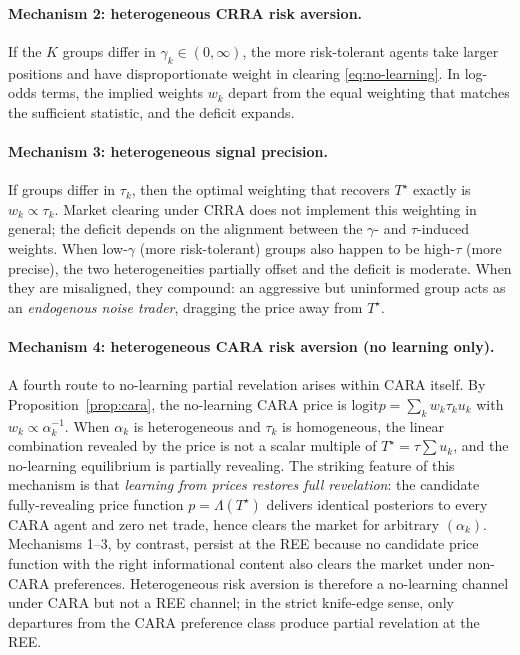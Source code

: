 \documentclass[12pt,letterpaper]{article}
\theoremstyle{definition}
\theoremstyle{remark}
\newcommand{\Lam}{\Lambda}            %
\newcommand{\logit}{\mathrm{logit}}
\newcommand{\Tstar}{T^{\!\star}}
\newcommand{\1}{\mathbf{1}}
\begin{document}
\paragraph{Mechanism 2: heterogeneous CRRA risk aversion.} If the $K$
groups differ in $\gamma_{k}\in(0,\infty)$, the more risk-tolerant agents
take larger positions and have disproportionate weight in clearing
\eqref{eq:no-learning}. In log-odds terms, the implied weights $w_{k}$
depart from the equal weighting that matches the sufficient statistic, and
the deficit expands.

\paragraph{Mechanism 3: heterogeneous signal precision.} If groups differ
in $\tau_{k}$, then the optimal weighting that recovers $\Tstar$ exactly is
$w_{k}\propto\tau_{k}$. Market clearing under CRRA does not implement this
weighting in general; the deficit depends on the alignment between the
$\gamma$- and $\tau$-induced weights. When low-$\gamma$ (more
risk-tolerant) groups also happen to be high-$\tau$ (more precise), the
two heterogeneities partially offset and the deficit is moderate. When
they are misaligned, they compound: an aggressive but uninformed group
acts as an \emph{endogenous noise trader}, dragging the price away from
$\Tstar$.

\paragraph{Mechanism 4: heterogeneous CARA risk aversion (no learning only).}
A fourth route to no-learning partial revelation arises within CARA itself.
By Proposition~\ref{prop:cara}, the no-learning CARA price is
$\logit p=\sum_{k}w_{k}\tau_{k}u_{k}$ with $w_{k}\propto\alpha_{k}^{-1}$.
When $\alpha_{k}$ is heterogeneous and $\tau_{k}$ is homogeneous, the
linear combination revealed by the price is not a scalar multiple of
$\Tstar=\tau\sum u_{k}$, and the no-learning equilibrium is partially
revealing. The striking feature of this mechanism is that
\emph{learning from prices restores full revelation}: the candidate
fully-revealing price function $p=\Lam(\Tstar)$ delivers identical
posteriors to every CARA agent and zero net trade, hence clears the market
for arbitrary $(\alpha_{k})$. Mechanisms 1--3, by contrast, persist at the
REE because no candidate price function with the right informational
content also clears the market under non-CARA preferences.
Heterogeneous risk aversion is therefore a no-learning channel under CARA
but not a REE channel; in the strict knife-edge sense, only departures
from the CARA preference class produce partial revelation at the REE.
\end{document}
